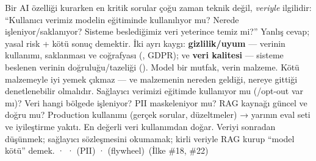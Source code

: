 
 Bir AI özelliği kurarken en kritik sorular çoğu zaman teknik değil,
\emph{veriyle} ilgilidir: ``Kullanıcı verimiz modelin eğitiminde kullanılıyor mu?
Nerede işleniyor/saklanıyor? Sisteme beslediğimiz veri yeterince temiz mi?''
Yanlış cevap; yasal risk + kötü sonuç demektir.
 İki ayrı kaygı: \textbf{gizlilik/uyum} --- verinin kullanımı, saklanması
ve coğrafyası (, GDPR); ve \textbf{veri kalitesi} --- sisteme
beslenen verinin doğruluğu/tazeliği ().
 Model bir mutfak, verin malzeme. Kötü malzemeyle iyi yemek çıkmaz ---
ve malzemenin nereden geldiği, nereye gittiği denetlenebilir olmalıdır.
 Sağlayıcı verimizi eğitimde kullanıyor mu (/opt-out var mı)?
Veri hangi bölgede işleniyor? PII maskeleniyor mu? RAG kaynağı güncel ve doğru mu?
 Production kullanımı (gerçek sorular, düzeltmeler) → yarının
eval seti ve iyileştirme yakıtı. En değerli veri kullanımdan doğar.
 Veriyi sonradan düşünmek; sağlayıcı sözleşmesini okumamak; kirli veriyle
RAG kurup ``model kötü'' demek.
  ·  ·  (PII) ·  (flywheel) \,{\scriptsize\color{softgray}(İlke \#18, \#22)}

